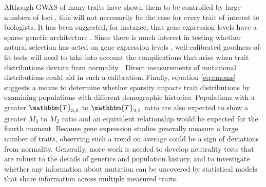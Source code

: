 Although GWAS of many traits have shown them to be controlled by large numbers
of loci \citep{Boyle2017}, this will not necessarily be the case for every trait
of interest to biologists. It has been suggested, for instance, that gene
expression levels have a sparse genetic architecture \citep{Wheeler2016}. Since
there is much interest in testing whether natural selection has acted on gene
expression levels \citep{Whitehead2006,Gilad2006,Yang2017}, well-calibrated
goodness-of-fit tests will need to take into account the complications that
arise when trait distributions deviate from normality \citep{Khaitovich2005}.
Direct measurements of mutational distributions \citep{Gruber2012,Metzger2016}
could aid in such a calibration. Finally, equation \eqref{eq:emoms} suggests a
means to determine whether sparsity impacts trait distributions by examining
populations with different demographic histories. Populations with a greater
$\mathbbm{T}_{3,3}$ to $\mathbbm{T}_{2,2}$ ratio are also expected to show a
greater $M_3$ to $M_2$ ratio and an equivalent relationship would be expected
for the fourth moment. Because gene expression studies generally measure a large
number of traits, observing such a trend on average could be a sign of
deviations from normality. Generally, more work is needed to develop neutrality
tests that are robust to the details of genetics and population history, and to
investigate whether any information about mutation can be uncovered by
statistical models that share information across multiple measured traits. 

